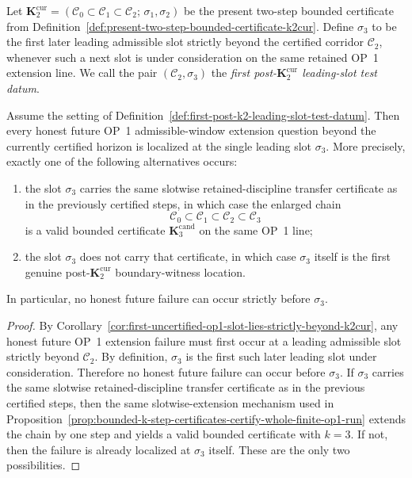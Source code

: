 \begin{definition}
\label{def:first-post-k2-leading-slot-test-datum}
Let $\mathbf K_2^{\mathrm{cur}}=(\mathcal C_0\subset \mathcal C_1\subset \mathcal C_2;\,\sigma_1,\sigma_2)$ be the present two-step bounded certificate from Definition~\ref{def:present-two-step-bounded-certificate-k2cur}. Define $\sigma_3$ to be the first later leading admissible slot strictly beyond the certified corridor $\mathcal C_2$, whenever such a next slot is under consideration on the same retained OP~1 extension line. We call the pair $(\mathcal C_2,\sigma_3)$ the \emph{first post-$\mathbf K_2^{\mathrm{cur}}$ leading-slot test datum}.
\end{definition}

\begin{proposition}
\label{prop:first-honest-future-op1-extension-question-beyond-k2cur-localized-at-sigma3}
Assume the setting of Definition~\ref{def:first-post-k2-leading-slot-test-datum}. Then every honest future OP~1 admissible-window extension question beyond the currently certified horizon is localized at the single leading slot $\sigma_3$. More precisely, exactly one of the following alternatives occurs:
\begin{enumerate}[label=(\roman*),leftmargin=2em]
  \item the slot $\sigma_3$ carries the same slotwise retained-discipline transfer certificate as in the previously certified steps, in which case the enlarged chain
  \[
    \mathcal C_0\subset \mathcal C_1\subset \mathcal C_2\subset \mathcal C_3
  \]
  is a valid bounded certificate $\mathbf K_3^{\mathrm{cand}}$ on the same OP~1 line;
  \item the slot $\sigma_3$ does not carry that certificate, in which case $\sigma_3$ itself is the first genuine post-$\mathbf K_2^{\mathrm{cur}}$ boundary-witness location.
\end{enumerate}
In particular, no honest future failure can occur strictly before $\sigma_3$.
\end{proposition}

\begin{proof}
By Corollary~\ref{cor:first-uncertified-op1-slot-lies-strictly-beyond-k2cur}, any honest future OP~1 extension failure must first occur at a leading admissible slot strictly beyond $\mathcal C_2$. By definition, $\sigma_3$ is the first such later leading slot under consideration. Therefore no honest future failure can occur before $\sigma_3$. If $\sigma_3$ carries the same slotwise retained-discipline transfer certificate as in the previous certified steps, then the same slotwise-extension mechanism used in Proposition~\ref{prop:bounded-k-step-certificates-certify-whole-finite-op1-run} extends the chain by one step and yields a valid bounded certificate with $k=3$. If not, then the failure is already localized at $\sigma_3$ itself. These are the only two possibilities.
\end{proof}

